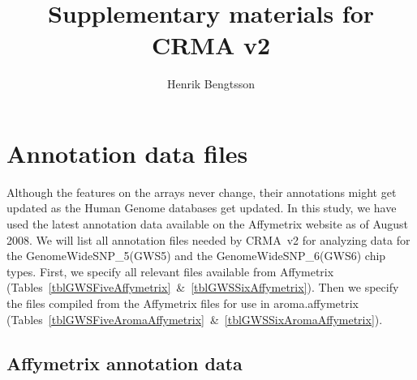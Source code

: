 \documentclass[10pt,a4paper]{article}
\newcommand{\GWSFivef}{GenomeWideSNP\_5\xspace}
\newcommand{\GWSSixf}{GenomeWideSNP\_6\xspace}
\begin{document}
\title{Supplementary materials for CRMA v2}
\author{Henrik Bengtsson}
\maketitle
\tableofcontents

\clearpage
\section{Annotation data files}
Although the features on the arrays never change, their annotations might get updated as the Human Genome databases get updated.  In this study, we have used the latest annotation data available on the Affymetrix website as of August 2008.
We will list all annotation files needed by CRMA~v2 for analyzing data for the \GWSFivef (GWS5) and the \GWSSixf (GWS6) chip types.  First, we specify all relevant files available from Affymetrix (Tables~\ref{tblGWSFiveAffymetrix}~\&~\ref{tblGWSSixAffymetrix}).  Then we specify the files compiled from the Affymetrix files for use in aroma.affymetrix (Tables~\ref{tblGWSFiveAromaAffymetrix}~\&~\ref{tblGWSSixAromaAffymetrix}).

\subsection{Affymetrix annotation data}
\end{document}
